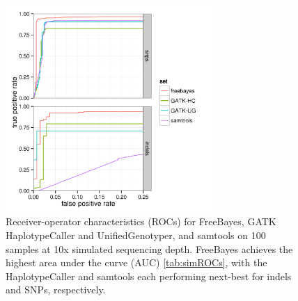 \documentclass{article}
\begin{document}

\begin{figure}[h!]
\centering
\includegraphics[width=0.7\textwidth]{100samples10x_0_25_both}
\caption{Receiver-operator characteristics (ROCs) for FreeBayes, GATK HaplotypeCaller and UnifiedGenotyper, and samtools on 100 samples at 10x simulated sequencing depth.  FreeBayes achieves the highest area under the curve (AUC) \ref{tab:simROCs}, with the HaplotypeCaller and samtools each performing next-best for indels and SNPs, respectively.}
\label{fig:10xROC}
\end{figure}
\end{document}
